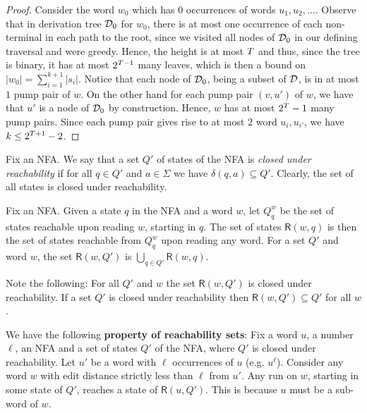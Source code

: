 \documentclass{CSML}
\newcommand{\R}{\textsf{R}}
\begin{document}
\begin{proof}
  \smallskip{}
  Consider the word $w_0$ which has $0$ occurrences of words $u_1, u_2, \ldots$. Observe that in derivation tree $\mathcal{D}_0$ for $w_0$, there is at most one occurrence of each non-terminal in each path to the root, since we visited all nodes of $\mathcal{D}_0$ in our defining traversal and were greedy. 
  Hence, the height is at most $T$ and thus, since the tree is binary, it has at most $2^{T-1}$ many leaves, which is then a bound on $|w_0|=\sum_{i=1}^{k+1} |s_i|$.
Notice that each node of $\mathcal{D}_0$, being a subset of $\mathcal{D}$, is in at most $1$ pump pair of $w$. On the other  hand for each pump pair $(v,u')$ of $w$, we have that $u'$ is a node of $\mathcal{D}_0$ by construction. Hence, $w$ has at most $2^{T}-1$ many pump pairs. Since each pump pair gives rise to at most $2$ word $u_i, u_{i'}$, we have $k\leq 2^{T+1}-2$.
\end{proof}

\smallskip{}
Fix an NFA.
We say that a set $Q'$ of states of the NFA is \emph{closed under reachability} if for all $q\in Q'$ and $a \in \Sigma$ we have $\delta(q,a)\subseteq Q'$. Clearly, the set of all states is closed under reachability.

\smallskip{}
Fix an NFA.
Given a state $q$ in the NFA and a word $w$, let $Q_q^w$ be the set of states reachable upon reading $w$, starting in $q$. The set of states $\R(w,q)$ is then the set of states reachable from $Q_q^w$ upon reading any word. For a set $Q'$ and word $w$, the set $\R(w,Q')$ is $\bigcup_{q\in Q'} \R(w,q)$. 


Note the following: For all $Q'$ and $w$ the set $\R(w,Q')$ is closed under reachability.
If a set $Q'$ is closed under reachability then $\R(w,Q')\subseteq Q'$ for all $w$. 

We have the following {\bf property of reachability sets}:  Fix a word $u$, a number $\ell$, an NFA and a set of states $Q'$ of the NFA, where $Q'$ is closed under reachability. Let $u'$ be a word with $\ell$ occurrences of $u$ (e.g. $u^\ell$).
Consider any word $w$ with edit distance strictly less than $\ell$ from $u'$. Any run on $w$, starting in some state of $Q'$, reaches a state of $\R(u,Q')$. This is because $u$ must be a sub-word of $w$. 
\end{document}
